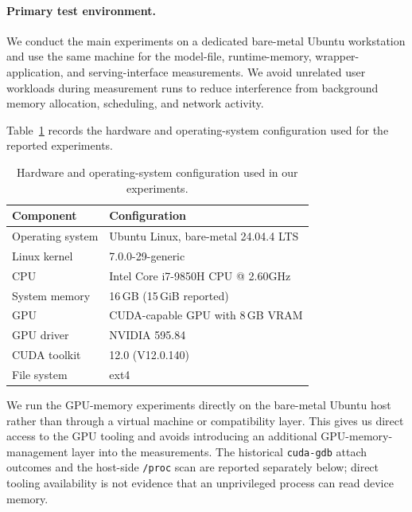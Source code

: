 \paragraph{Primary test environment.}
We conduct the main experiments on a dedicated bare-metal Ubuntu
workstation and use the same machine for the model-file, runtime-memory,
wrapper-application, and serving-interface measurements. We avoid
unrelated user workloads during measurement runs to reduce interference
from background memory allocation, scheduling, and network activity.

Table~\ref{tab:hardware_config} records the hardware and operating-system
configuration used for the reported experiments.

\begin{table}[!b]
    \centering
    \caption{\small Hardware and operating-system configuration used in
    our experiments.}
    \label{tab:hardware_config}
    \footnotesize
    \setlength{\tabcolsep}{4pt}
    \begin{tabular}{ll}
        \toprule
        \textbf{Component} & \textbf{Configuration} \\
        \midrule
        Operating system &
        Ubuntu Linux, bare-metal 24.04.4 LTS \\
        Linux kernel &
        7.0.0-29-generic \\
        CPU &
        Intel Core i7-9850H CPU @ 2.60GHz \\
        System memory &
        16\,GB (15\,GiB reported) \\
        GPU &
        CUDA-capable GPU with 8\,GB VRAM \\
        GPU driver &
        NVIDIA 595.84 \\
        CUDA toolkit &
        12.0 (V12.0.140) \\
        File system &
        ext4 \\
        \bottomrule
    \end{tabular}
\end{table}

We run the GPU-memory experiments directly on the bare-metal Ubuntu host
rather than through a virtual machine or compatibility layer. This gives
us direct access to the GPU tooling and avoids introducing an additional
GPU-memory-management layer into the measurements. The historical
\texttt{cuda-gdb} attach outcomes and the host-side \texttt{/proc} scan are
reported separately below; direct tooling availability is not evidence that
an unprivileged process can read device memory.

